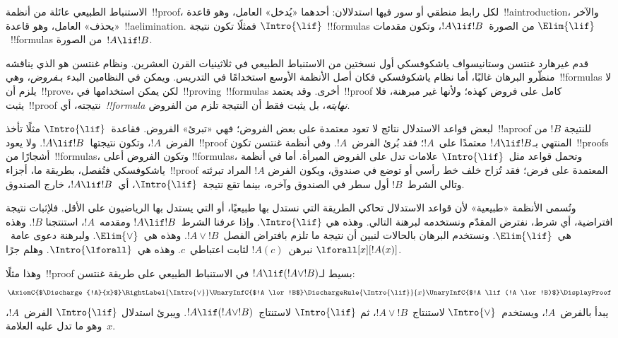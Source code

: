 \documentclass[../../../include/open-logic-section]{subfiles}
\begin{document}


الاستنباط الطبيعي عائلة من أنظمة~!!{proof}، لكل رابط منطقي أو سور فيها
استدلالان: أحدهما «يُدخل» العامل، وهو قاعدة~!!a{introduction}، والآخر
«يحذف» العامل، وهو قاعدة~!!a{elimination}. فمثلًا تكون نتيجة
$\Intro{\lif}$~!!{formula}s من الصورة~$!A \lif !B$، وتكون مقدمات
$\Elim{\lif}$~!!{formula}s من الصورة~$!A \lif !B$.

قدم غيرهارد غنتسن وستانيسواف ياشكوفسكي أول نسختين من الاستنباط الطبيعي
في ثلاثينيات القرن العشرين. ونظام غنتسن هو الذي يناقشه منظّرو البرهان
غالبًا، أما نظام ياشكوفسكي فكان أصل الأنظمة الأوسع استخدامًا في
التدريس. ويمكن في النظامين البدء بـ\emph{فروض}، وهي~!!{formula}s لا
يلزم أن~!!{prove}، لكن يمكن استخدامها في~!!{proving}~!!{formula}s
أخرى. وقد يعتمد~!!{proof} كامل على فروض كهذه؛ ولأنها غير مبرهنة، فلا
يثبت~!!{proof} نتيجته، أي~\emph{!!{formula} نهايته}، بل يثبت فقط أن
النتيجة تلزم من الفروض.

لبعض قواعد الاستدلال نتائج لا تعود معتمدة على بعض الفروض؛ فهي
«تبرئ» الفروض. فقاعدة~$\Intro{\lif}$ مثلًا تأخذ~!!a{proof} للنتيجة
$!B$ من الفرض~$!A$، وتكون نتيجتها~$!A \lif !B$. ولا يعود~!!{proof}
المنتهي بـ$!A \lif !B$ معتمدًا على~$!A$؛ فقد بُرئ الفرض~$!A$. وفي
أنظمة غنتسن تكون~!!{proof}s أشجارًا من~!!{formula}s، وتكون الفروض أعلى
!!{formula}s، وتحمل قواعد مثل~$\Intro{\lif}$ علامات تدل على الفروض
المبرأة. أما في أنظمة ياشكوفسكي فتُفصل، بطريقة ما، أجزاء~!!{proof}
المعتمدة على فرض؛ فقد تُزاح خلف خط رأسي أو توضع في صندوق، ويكون الفرض
$!A$ المراد تبرئته وتالي الشرط~$!B$ أول سطر في الصندوق وآخره، بينما تقع
نتيجة~$\Intro{\lif}$، أي~$!A \lif !B$، خارج الصندوق.

وتُسمى الأنظمة «طبيعية» لأن قواعد الاستدلال تحاكي الطريقة التي نستدل
بها طبيعيًا، أو التي يستدل بها الرياضيون على الأقل. فلإثبات نتيجة
افتراضية، أي شرط، نفترض المقدّم ونستخدمه لبرهنة التالي. وهذه هي
$\Intro{\lif}$. وإذا عرفنا الشرط~$!A \lif !B$ ومقدمه~$!A$، استنتجنا
$!B$. وهذه هي~$\Elim{\lif}$. ونستخدم البرهان بالحالات لنبين أن نتيجة
ما تلزم بافتراض الفصل~$!A \lor !B$. وهذه هي~$\Elim{\lor}$. ولبرهنة
دعوى عامة~$\lforall[x][!A(x)]$ نبرهن~$!A(c)$ لثابت اعتباطي~$c$. وهذه
هي~$\Intro{\lforall}$. وهلم جرًا.

وهذا مثلًا~!!{proof} بسيط لـ$!A \lif (!A \lor !B)$ في الاستنباط
الطبيعي على طريقة غنتسن:
\[
\AxiomC{$\Discharge{!A}{x}$}
\RightLabel{\Intro{\lor}}
\UnaryInfC{$!A \lor !B$}
\DischargeRule{\Intro{\lif}}{x}
\UnaryInfC{$!A \lif (!A \lor !B)$}
\DisplayProof
\]
يبدأ بالفرض~$!A$، ويستخدم~$\Intro{\lor}$ لاستنتاج~$!A \lor !B$، ثم
$\Intro{\lif}$ لاستنتاج~$!A \lif (!A \lor !B)$. ويبرئ استدلال
$\Intro{\lif}$ الفرض~$!A$، وهو ما تدل عليه العلامة~$x$.
\end{document}
